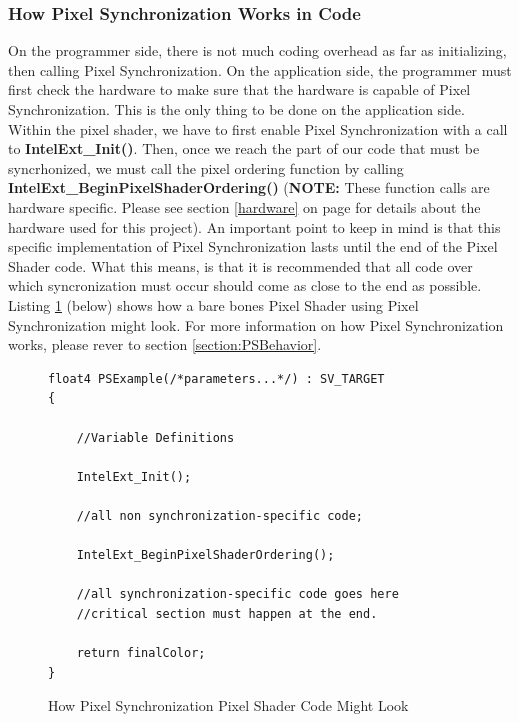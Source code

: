 \documentclass[a4paper, 12pt]{article}
\begin{document}
\subsubsection{How Pixel Synchronization Works in Code}

\label{section:PixSyncIntro}

\nohyphens{On the programmer side, there is not much coding overhead as far as
initializing, then calling Pixel Synchronization. On the application side, the
programmer must first check the hardware to make sure that the hardware is
capable of Pixel Synchronization. This is the only thing to be done on the
application side. Within the pixel shader, we have to first enable Pixel
Synchronization with a call to \textbf{IntelExt\_Init()}. Then, once we reach
the part of our code that must be syncrhonized, we must call the pixel
ordering function by calling \textbf{IntelExt\_BeginPixelShaderOrdering()}
(\textbf{NOTE:} These function calls are hardware specific. Please see section
\ref{hardware} on page \pageref{hardware} for details about the hardware used
for this project). An important point to keep in mind is that this specific
implementation of Pixel Synchronization lasts until the end of the Pixel
Shader code. What this means, is that it is recommended that all code over
which syncronization must occur should come as close to the end as possible.
Listing \ref{code:PSExample} (below) shows how a bare bones Pixel Shader using
Pixel Synchronization might look. For more information on how Pixel Synchronization works, please rever to section \ref{section:PSBehavior}.}


\begin{figure}[h]
\begin{lstlisting}[language=HLSL]
float4 PSExample(/*parameters...*/) : SV_TARGET
{

	//Variable Definitions

	IntelExt_Init();
	
	//all non synchronization-specific code;

	IntelExt_BeginPixelShaderOrdering();

	//all synchronization-specific code goes here
	//critical section must happen at the end.

	return finalColor;
}

\end{lstlisting}
\caption{How Pixel Synchronization Pixel Shader Code Might Look}
\label{code:PSExample}
\end{figure}

\pagebreak
\end{document}
